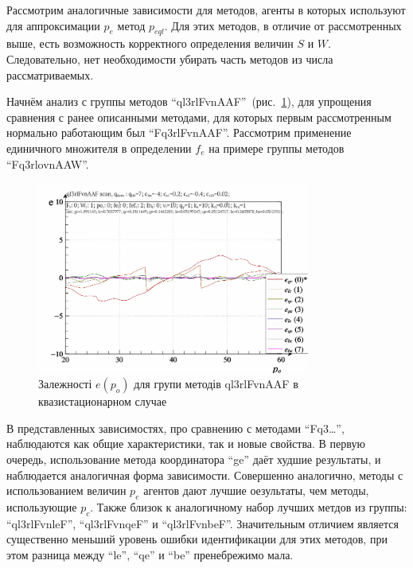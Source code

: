 Рассмотрим аналогичные зависимости для методов, агенты в которых
используют для аппроксимации $p_e$ метод $p_{eql}$.
Для этих методов, в отличие от рассмотренных выше,
есть возможность корректного определения величин $S$ и $W$.
Следовательно, нет необходимости убирать часть методов из числа рассматриваемых.

Начнём анализ с группы методов ``ql3rlFvnAAF''~(рис.~\ref{atu:f:ql3rlFvnAAF_scan}), для упрощения сравнения
с ранее описанными методами, для которых первым рассмотренным нормально работающим был ``Fq3rlFvnAAF''.
Рассмотрим применение единичного множителя в определении $f_e$ на примере группы методов ``Fq3rlovnAAW''.

\begin{figure}[htb!]
  \begin{center}
    \includegraphics[width=0.8\textwidth]{p/scan/qls-p_p_e_ql3rlFvnAAF_scan.png}
  \end{center}
  \caption{Залежності $e(p_o)$ для групи методів ql3rlFvnAAF в квазистационарном случае}
  \label{atu:f:ql3rlFvnAAF_scan}
\end{figure}

В представленных зависимостях, про сравнению с методами ``Fq3\ldots'', наблюдаются
как общие характеристики, так и новые свойства. В первую очередь,
использование метода координатора ``ge'' даёт худшие результаты,
и наблюдается аналогичная форма зависимости.
Совершенно аналогично, методы с использованием величин $p_e$ агентов
дают лучшие оезультаты, чем методы,  использующие $p_c$.
Также близок к аналогичному набор лучших метдов из группы:
``ql3rlFvnleF'', ``ql3rlFvnqeF'' и ``ql3rlFvnbeF''.
Значительным отличием является существенно меньший уровень ошибки
идентификации для этих методов, при этом разница между
``le'', ``qe'' и ``be'' пренебрежимо мала.



